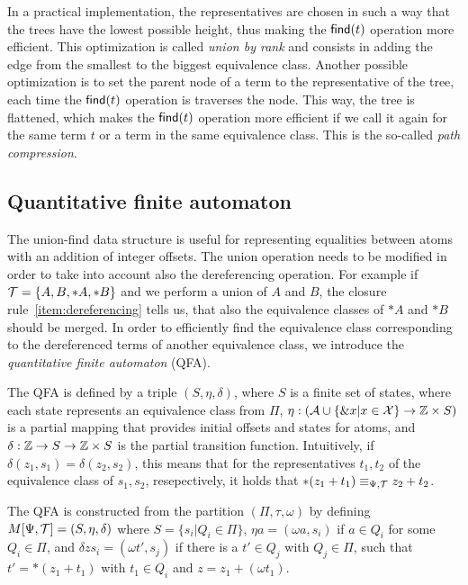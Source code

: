 In a practical implementation, the representatives are chosen in such a way that the trees have the lowest possible height,
thus making the $\textsf{find}(t)$ operation more efficient.
This optimization is called \emph{union by rank} and consists in adding the edge from
the smallest to the biggest equivalence class.
Another possible optimization is to set the parent node of a term to the representative of the tree,
each time the $\textsf{find}(t)$ operation is traverses the node.
This way, the tree is flattened, which makes the $\textsf{find}(t)$ operation
more efficient if we call it again for the same term $t$ or a term in the same equivalence class.
This is the so-called \emph{path compression}.~\cite{uf-tarjan}

\subsection{Quantitative finite automaton}\label{subsection:qfa}

The union-find data structure is useful for representing equalities between atoms
with an addition of integer offsets.
The union operation needs to be modified in order to take into account also the dereferencing operation.
For example if $\mathcal{T} = \{A, B, *A, *B\}$ and we perform a union of $A$ and $B$, the
closure rule~\ref{item:dereferencing} tells us, that also the equivalence classes of $*A$ and $*B$ should be merged.
In order to efficiently find the equivalence class corresponding to the dereferenced terms of another equivalence class, we introduce the \emph{quantitative finite automaton} (QFA).

The QFA is defined by a triple $(S, \eta, \delta)$, where $S$ is a finite set of states, where each state represents an equivalence class from $\Pi$, $\eta : (\mathcal{A} \cup \{\&x | x \in \mathcal{X}\} \rightarrow \mathbb{Z} \times S)$ is a partial mapping that provides initial offsets and states for atoms, and $\delta : \mathbb{Z} \rightarrow S \rightarrow \mathbb{Z} \times S$ is the partial transition function.
Intuitively, if $\delta(z_1, s_1) = \delta(z_2, s_2)$, this means that for the representatives
$t_1, t_2$ of the equivalence class of $s_1,s_2$, resepectively, it holds that $*(z_1 + t_1) \equiv_{\Psi,\mathcal{T}} z_2 + t_2$.

The QFA is constructed from the partition  $(\Pi, \tau, \omega)$ by defining $M[\Psi,\mathcal{T}] = (S, \eta, \delta)$ where $S = \{s_i | Q_i \in \Pi\}$, $\eta a = (\omega a, s_i)$ if $a \in Q_i$ for some $Q_i \in \Pi$, and $\delta z s_i = (\omega t', s_j)$ if there is a $t' \in Q_j$ with $Q_j \in \Pi$, such that $t' = *(z_1 + t_1)$ with $t_1 \in Q_i$ and $z = z_1 + (\omega t_1)$.


